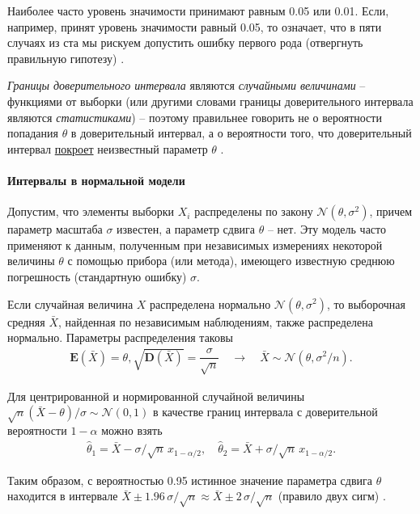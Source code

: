 \documentclass[%
	11pt,
	a4paper,
	utf8,
		]{article}
\begin{document}
Наиболее часто уровень значимости принимают равным 0.05 или 0.01. Если, например, принят уровень значимости равный 0.05, то означает, что в пяти случаях из ста мы рискуем допустить ошибку первого рода (отвергнуть правильную гипотезу) \cite[284]{gmurman:1972}.

\emph{Границы доверительного интервала} являются \emph{случайными величинами} -- функциями от выборки (или другими словами границы доверительного интервала являются \emph{статистиками}) -- поэтому правильнее говорить не о вероятности попадания $ \theta $ в доверительный интервал, а о вероятности того, что доверительный интервал \underline{покроет} неизвестный параметр $ \theta $ \cite[216]{gmurman:1972}.

\paragraph{Интервалы в нормальной модели} Допустим, что элементы выборки $ X_i $ распределены по закону $ \mathcal{N}(\theta, \sigma^2) $, причем параметр масштаба $ \sigma $ известен, а параметр сдвига $ \theta $ -- нет. Эту модель часто применяют к данным, полученным при независимых измерениях некоторой величины $ \theta $ с помощью прибора (или метода), имеющего известную среднюю погрешность (стандартную ошибку) $ \sigma $.

Если случайная величина $ X $ распределена нормально $ \mathcal{N}(\theta, \sigma^2) $, то выборочная средняя $ \bar{X} $, найденная по независимым наблюдениям, также распределена нормально. Параметры распределения таковы \cite{gmurman:1972}
\begin{align*}
	\mathbf{E}(\bar{X}) = \theta, \sqrt{\mathbf{D}(\bar{X})} = \dfrac{\sigma}{\sqrt{n}} \quad \to \quad \bar{X} \sim \mathcal{N}(\theta, \sigma^2/n).
\end{align*}

Для центрированной и нормированной случайной величины $ \sqrt{n}(\bar{X} - \theta)/\sigma \sim \mathcal{N}(0,1) $ в качестве границ интервала с доверительной вероятности $ 1 - \alpha $ можно взять
\begin{align*}
	\hat{\theta}_1 = \bar{X} - \sigma/\sqrt{n} \, x_{1 - \alpha/2}, \quad \hat{\theta}_2 = \bar{X} + \sigma/\sqrt{n} \, x_{1 - \alpha/2}.
\end{align*}

Таким образом, с вероятностью 0.95 истинное значение параметра сдвига $ \theta $ находится в интервале $ \bar{X} \pm 1.96\, \sigma/\sqrt{n} \approx \bar{X} \pm 2\, \sigma/\sqrt{n} $ (правило двух сигм) \cite[147]{lagutin:2009}.
\end{document}
